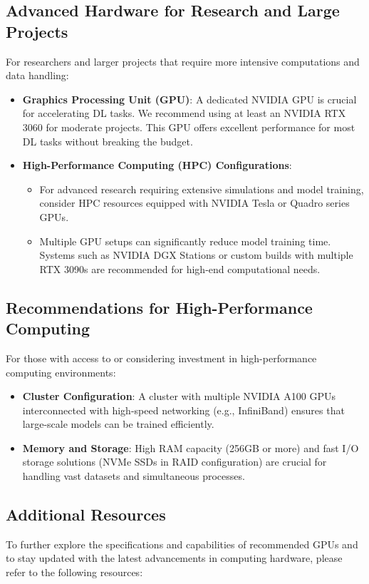 \subsection{Advanced Hardware for Research and Large Projects}
For researchers and larger projects that require more intensive computations and data handling:

\begin{itemize}
    \item \textbf{Graphics Processing Unit (GPU)}: A dedicated NVIDIA GPU is crucial for accelerating DL tasks. We recommend using at least an NVIDIA RTX 3060 for moderate projects. This GPU offers excellent performance for most DL tasks without breaking the budget.
    \item \textbf{High-Performance Computing (HPC) Configurations}:
    \begin{itemize}
        \item For advanced research requiring extensive simulations and model training, consider HPC resources equipped with NVIDIA Tesla or Quadro series GPUs.
        \item Multiple GPU setups can significantly reduce model training time. Systems such as NVIDIA DGX Stations or custom builds with multiple RTX 3090s are recommended for high-end computational needs.
    \end{itemize}
\end{itemize}

\subsection{Recommendations for High-Performance Computing}
For those with access to or considering investment in high-performance computing environments:

\begin{itemize}
    \item \textbf{Cluster Configuration}: A cluster with multiple NVIDIA A100 GPUs interconnected with high-speed networking (e.g., InfiniBand) ensures that large-scale models can be trained efficiently.
    \item \textbf{Memory and Storage}: High RAM capacity (256GB or more) and fast I/O storage solutions (NVMe SSDs in RAID configuration) are crucial for handling vast datasets and simultaneous processes.
\end{itemize}

\subsection{Additional Resources}
To further explore the specifications and capabilities of recommended GPUs and to stay updated with the latest advancements in computing hardware, please refer to the following resources:

